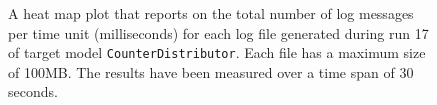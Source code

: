 \begin{figure}[htbp]
\centering
\begin{minipage}{1\textwidth}
  \centering
\end{minipage}
\caption{A heat map plot that reports on the total number of log messages per time unit (milliseconds) for each log file generated during run 17 of target model \texttt{CounterDistributor}. Each file has a maximum size of 100MB. The results have been measured over a time span of 30 seconds.}
\label{figure:throughput_sum_counterdistributor_17}
\end{figure}